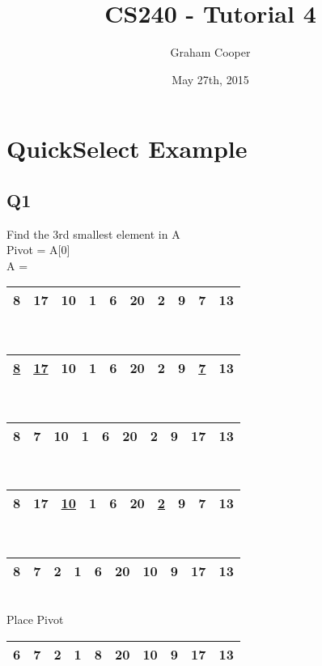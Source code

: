 \documentclass[12pt]{article}
\title{\vspace{-15ex}CS240 - Tutorial 4\vspace{-1ex}}
\date{May 27th, 2015}
\author{Graham Cooper}
\begin{document}
	\maketitle
	
	\section*{QuickSelect Example}
	
	\subsection*{Q1}
	Find the 3rd smallest element in A\\
	Pivot = A[0]\\
	A = \\
	\begin{tabular}{|c | c | c | c | c | c | c | c | c | c|}
		\hline
		8 & 17 & 10 & 1 & 6 & 20 & 2 & 9 & 7 & 13 \\ \hline
	\end{tabular}\\
	\begin{tabular}{|c | c | c | c | c | c | c | c | c | c|}
		\hline
		\underline{8} & \underline{17} & 10 & 1 & 6 & 20 & 2 & 9 & \underline{7} & 13 \\ \hline
	\end{tabular}\\
	\begin{tabular}{|c | c | c | c | c | c | c | c | c | c|}
		\hline
		8 & 7 & 10 & 1 & 6 & 20 & 2 & 9 & 17 & 13 \\ \hline
	\end{tabular}\\
	\begin{tabular}{|c | c | c | c | c | c | c | c | c | c|}
		\hline
		8 & 17 & \underline{10} & 1 & 6 & 20 & \underline{2} & 9 & 7 & 13 \\ \hline
	\end{tabular} \\
	\begin{tabular}{|c | c | c | c | c | c | c | c | c | c|}
		\hline
		8 & 7 & 2 & 1 & 6 & 20 & 10 & 9 & 17 & 13 \\ \hline
	\end{tabular}\\
	Place Pivot\\
	\begin{tabular}{|c | c | c | c | c | c | c | c | c | c|}
		\hline
		6 & 7 & 2 & 1 & 8 & 20 & 10 & 9 & 17 & 13 \\ \hline
	\end{tabular}\\
	
\end{document}
